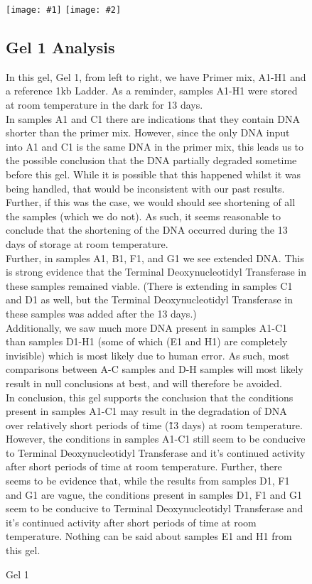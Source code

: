\documentclass[a4paper]{article}
\newcommand{\tdt}{Terminal Deoxynucleotidyl Transferase}
\begin{document}
\newcommand{\gel}[4]{
\begin{figure}[ht]
\label{#3}
\begin{center}
\texttt{[image: \#1]}
\texttt{[image: \#2]}
\caption{#3}
\end{center}
\subsection{#3 Analysis}
#4
\end{figure}
}
\gel{1_1-tlw13.png}{1_2-tlw13.png}{Gel 1}{
In this gel, Gel 1, from left to right, we have Primer mix, A1-H1 and a reference 1kb Ladder. As a reminder, samples A1-H1 were stored at room temperature in the dark for 13 days.\\

In samples A1 and C1 there are indications that they contain DNA shorter than the primer mix. However, since the only DNA input into A1 and C1 is the same DNA in the primer mix, this leads us to the possible conclusion that the DNA partially degraded sometime before this gel. While it is possible that this happened whilst it was being handled, that would be inconsistent with our past results. Further, if this was the case, we would should see shortening of all the samples (which we do not). As such, it seems reasonable to conclude that the shortening of the DNA occurred during the 13 days of storage at room temperature.\\

Further, in samples A1, B1, F1, and G1 we see extended DNA. This is strong evidence that the \tdt{} in these samples remained viable. (There is extending in samples C1 and D1 as well, but the \tdt{} in these samples was added after the 13 days.)\\

Additionally, we saw much more DNA present in samples A1-C1 than samples D1-H1 (some of which (E1 and H1) are completely invisible) which is most likely due to human error. As such, most comparisons between A-C samples and D-H samples will most likely result in null conclusions at best, and will therefore be avoided.\\

In conclusion, this gel supports the conclusion that the conditions present in samples A1-C1 may result in the degradation of DNA over relatively short periods of time (\~13 days) at room temperature. However, the conditions in samples A1-C1 still seem to be conducive to \tdt{} and it's continued activity after short periods of time at room temperature. Further, there seems to be evidence that, while the results from samples D1, F1 and G1 are vague, the conditions present in samples D1, F1 and G1 seem to be conducive to \tdt{} and it's continued activity after short periods of time at room temperature. Nothing can be said about samples E1 and H1 from this gel. 
}
\end{document}
